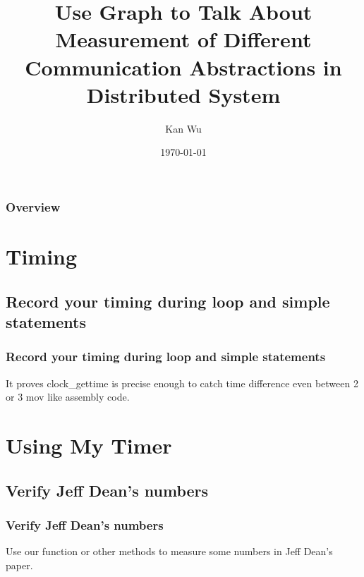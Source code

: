 \documentclass{beamer}
\title[Project 1 - Measurement]{Use Graph to Talk About Measurement of Different Communication Abstractions in Distributed System} %
\author{Kan Wu} %
\institute[UW-Madison] %
{
University of Wisconsin, Madison \\ %
\medskip
\textit{kanwu@cs.wisc.edu} %
}
\date{\today} %
\begin{document}
    \begin{frame}
        \titlepage %
    \end{frame}

    \begin{frame}
        \frametitle{Overview} %
        \tableofcontents %
    \end{frame}


\section{Timing}
    \subsection{Record your timing during loop and simple statements}
    \begin{frame}
        \frametitle{Record your timing during loop and simple statements}
        It proves clock\_gettime is precise enough to catch time difference even between 2 or 3 mov like assembly code.

    \end{frame}


   
\section{Using My Timer}
    \subsection{Verify Jeff Dean's numbers}
    \begin{frame}
        \frametitle{Verify Jeff Dean's numbers}
        Use our function or other methods to measure some numbers in Jeff Dean's paper. 

        
    \end{frame}
\end{document}
